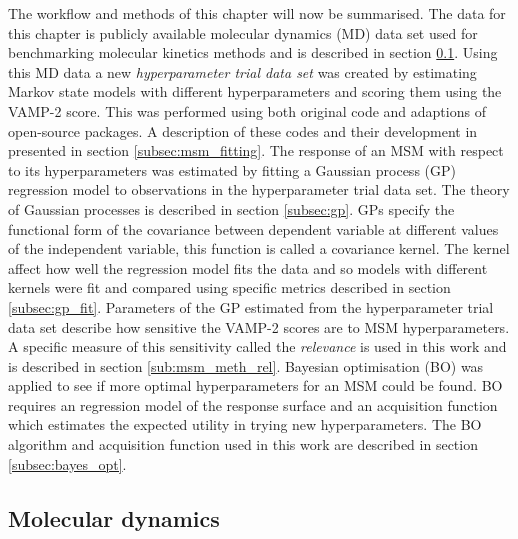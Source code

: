 The workflow and methods of this chapter will now be summarised.  The data for this chapter is publicly available molecular dynamics (MD) data set used for benchmarking molecular kinetics methods and is described in section \ref{sec:msm_md}.  Using this MD data a new \emph{hyperparameter trial data set} was created by estimating Markov state models with different hyperparameters and scoring them using the VAMP-2 score. This was performed using both original code and adaptions of open-source packages.  A description of these codes and their development in presented in section \ref{subsec:msm_fitting}.  The response of an MSM with respect to its hyperparameters was estimated by fitting a  Gaussian process (GP) regression model to observations in the hyperparameter trial data set.  The theory of Gaussian processes is described in section \ref{subsec:gp}. GPs specify the functional form of the covariance between dependent variable at different values of the independent variable, this function is called a covariance kernel. The kernel affect how well the regression model fits the data and so models with different kernels were fit and compared using  specific metrics described in section \ref{subsec:gp_fit}. Parameters of the GP estimated from the hyperparameter trial data set describe how sensitive the VAMP-2 scores are to MSM hyperparameters. A specific measure of this sensitivity called the \emph{relevance} is used in this work and is described in section \ref{sub:msm_meth_rel}.  Bayesian optimisation (BO) was applied to see if more optimal hyperparameters for an MSM could be found. BO requires an regression model of the response surface and an acquisition function which estimates the expected utility in trying new hyperparameters. The BO algorithm and acquisition function used in this work are described in section \ref{subsec:bayes_opt}.   

\subsection{Molecular dynamics}\label{sec:msm_md}

